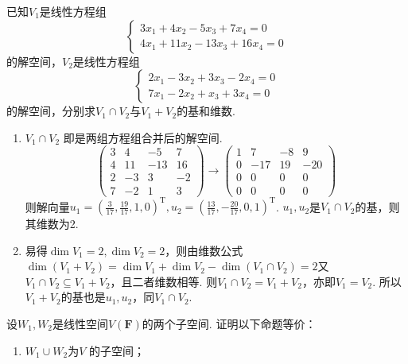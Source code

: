 \begin{exercise}
    \begin{exgroup}
        \item 已知$V_1$是线性方程组\[\begin{cases}
                3x_1+4x_2-5x_3+7x_4=0 \\
                4x_1+11x_2-13x_3+16x_4=0
            \end{cases}\]
        的解空间，$V_2$是线性方程组\[\begin{cases}
                2x_1-3x_2+3x_3-2x_4=0 \\
                7x_1-2x_2+x_3+3x_4=0
            \end{cases}\]
        的解空间，分别求$V_1 \cap V_2$与$V_1+V_2$的基和维数.
        \begin{answer}
            \begin{enumerate}
                \item $V_1\cap V_2$ 即是两组方程组合并后的解空间.
                      \[\begin{pmatrix}
                              3 & 4  & -5  & 7  \\
                              4 & 11 & -13 & 16 \\
                              2 & -3 & 3   & -2 \\
                              7 & -2 & 1   & 3
                          \end{pmatrix}\rightarrow
                          \begin{pmatrix}1 & 7   & -8 & 9   \\
                 0 & -17 & 19 & -20 \\
                 0 & 0   & 0  & 0   \\
                 0 & 0   & 0  & 0
                          \end{pmatrix}\]
                      则解向量$u_1=\left(\frac {3}{17},\frac{19}{17},1,0\right)^\mathrm{T},u_2=\left(\frac{13}{17},-\frac{20}{17},0,1\right)^\mathrm{T}$. $u_1,u_2$是$V_1\cap V_2$的基，则其维数为2.

                \item 易得$\dim V_1=2,\dim V_2=2$，则由维数公式$\dim (V_1+V_2)=\dim V_1+\dim V_2-\dim (V_1\cap V_2)= 2$又$V_1\cap V_2\subseteq V_1+V_2$，且二者维数相等. 则$V_1\cap V_2=V_1+V_2$，亦即$V_1=V_2$. 所以$V_1+V_2$的基也是$u_1,u_2$，同$V_1\cap V_2$.
            \end{enumerate}
        \end{answer}
        \item 设$W_1,W_2$是线性空间$V(\mathbf{F})$的两个子空间. 证明以下命题等价：
        \begin{enumerate}
            \item $W_1 \cup W_2$为$V$ 的子空间；


\end{enumerate}
\end{exgroup}
\end{exercise}
